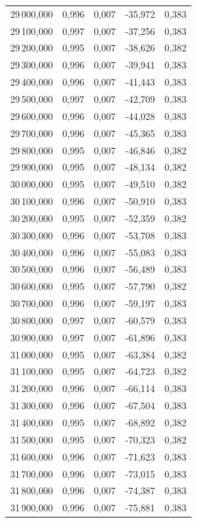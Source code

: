 \begin{longtable}{rrrrr}
29\,000,000 & 0,996 & 0,007 & -35,972 & 0,383\\
29\,100,000 & 0,997 & 0,007 & -37,256 & 0,383\\
29\,200,000 & 0,995 & 0,007 & -38,626 & 0,382\\
29\,300,000 & 0,996 & 0,007 & -39,941 & 0,383\\
29\,400,000 & 0,996 & 0,007 & -41,443 & 0,383\\
29\,500,000 & 0,997 & 0,007 & -42,709 & 0,383\\
29\,600,000 & 0,996 & 0,007 & -44,028 & 0,383\\
29\,700,000 & 0,996 & 0,007 & -45,365 & 0,383\\
29\,800,000 & 0,995 & 0,007 & -46,846 & 0,382\\
29\,900,000 & 0,995 & 0,007 & -48,134 & 0,382\\
30\,000,000 & 0,995 & 0,007 & -49,510 & 0,382\\
30\,100,000 & 0,996 & 0,007 & -50,910 & 0,383\\
30\,200,000 & 0,995 & 0,007 & -52,359 & 0,382\\
30\,300,000 & 0,996 & 0,007 & -53,708 & 0,383\\
30\,400,000 & 0,996 & 0,007 & -55,083 & 0,383\\
30\,500,000 & 0,996 & 0,007 & -56,489 & 0,383\\
30\,600,000 & 0,995 & 0,007 & -57,790 & 0,382\\
30\,700,000 & 0,996 & 0,007 & -59,197 & 0,383\\
30\,800,000 & 0,997 & 0,007 & -60,579 & 0,383\\
30\,900,000 & 0,997 & 0,007 & -61,896 & 0,383\\
31\,000,000 & 0,995 & 0,007 & -63,384 & 0,382\\
31\,100,000 & 0,995 & 0,007 & -64,723 & 0,382\\
31\,200,000 & 0,996 & 0,007 & -66,114 & 0,383\\
31\,300,000 & 0,996 & 0,007 & -67,504 & 0,383\\
31\,400,000 & 0,995 & 0,007 & -68,892 & 0,382\\
31\,500,000 & 0,995 & 0,007 & -70,323 & 0,382\\
31\,600,000 & 0,996 & 0,007 & -71,623 & 0,383\\
31\,700,000 & 0,996 & 0,007 & -73,015 & 0,383\\
31\,800,000 & 0,996 & 0,007 & -74,387 & 0,383\\
31\,900,000 & 0,996 & 0,007 & -75,881 & 0,383\\

\end{longtable}
